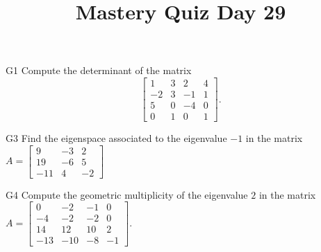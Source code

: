 \documentclass{sbgLAquiz}
\title{Mastery Quiz Day 29 }
\begin{document}
\begin{problem}{G1}
Compute the determinant of the matrix
\[
  \begin{bmatrix}
    1 & 3 & 2 & 4 \\
    -2 & 3 & -1 & 1 \\
    5 & 0 & -4 & 0 \\
    0 & 1 & 0 & 1
  \end{bmatrix}
.\]
\end{problem}

\begin{problem}{G3}
Find the eigenspace associated to the eigenvalue $-1$ in the matrix $A=\begin{bmatrix}9 & -3 & 2 \\ 19 & -6 & 5 \\ -11 & 4 & -2 \end{bmatrix}$
\end{problem}
\newpage

\begin{problem}{G4}
Compute the geometric multiplicity of the eigenvalue $2$ in the matrix $A=\begin{bmatrix}0 & -2 & -1 & 0 \\ -4 & -2 & -2 & 0 \\ 14 & 12 & 10 & 2 \\ -13 & -10 & -8 & -1 \end{bmatrix}$.
\end{problem}
\end{document}

